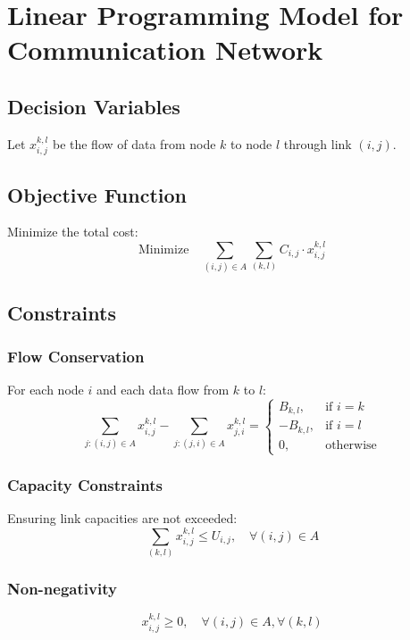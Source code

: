 \documentclass{article}
\begin{document}
\section*{Linear Programming Model for Communication Network}

\subsection*{Decision Variables}
Let \( x_{i,j}^{k,l} \) be the flow of data from node \( k \) to node \( l \) through link \( (i, j) \).

\subsection*{Objective Function}
Minimize the total cost:
\[
\text{Minimize} \quad \sum_{(i,j) \in A} \sum_{(k, l)} C_{i,j} \cdot x_{i,j}^{k,l}
\]

\subsection*{Constraints}

\subsubsection*{Flow Conservation}
For each node \( i \) and each data flow from \( k \) to \( l \):
\[
\sum_{j: (i,j) \in A} x_{i,j}^{k,l} - \sum_{j: (j,i) \in A} x_{j,i}^{k,l} = 
\begin{cases} 
B_{k,l}, & \text{if } i = k \\ 
-B_{k,l}, & \text{if } i = l \\ 
0, & \text{otherwise}
\end{cases}
\]

\subsubsection*{Capacity Constraints}
Ensuring link capacities are not exceeded:
\[
\sum_{(k, l)} x_{i,j}^{k,l} \leq U_{i,j}, \quad \forall (i,j) \in A
\]

\subsubsection*{Non-negativity}
\[
x_{i,j}^{k,l} \geq 0, \quad \forall (i,j) \in A, \forall (k, l)
\]
\end{document}
